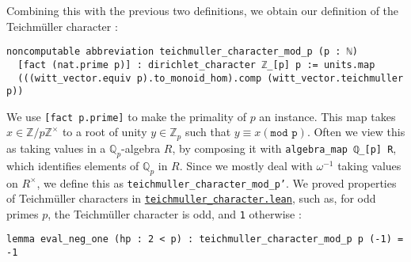 \documentclass[a4paper,UKenglish,cleveref, autoref, thm-restate,pdfa]{lipics-v2021}
\newcommand{\lean}[1]{\texttt{#1}\xspace} %
\begin{document}
Combining this with the previous two definitions, we obtain our definition of the Teichmüller character : 
\begin{lstlisting}
noncomputable abbreviation teichmuller_character_mod_p (p : ℕ) 
  [fact (nat.prime p)] : dirichlet_character ℤ_[p] p := units.map 
  (((witt_vector.equiv p).to_monoid_hom).comp (witt_vector.teichmuller p))
\end{lstlisting}
We use \lean{[fact p.prime]} to make the primality of $p$ an instance. This map takes \newline $x \in \mathbb{Z}/p\mathbb{Z}^{\times}$ to a root of unity $y \in \mathbb{Z}_p$ such that $y \equiv x (\texttt{mod p})$. 
Often we view this as taking values in a $\mathbb{Q}_p$-algebra $R$, by composing it 
with \lean{algebra\_map ℚ\_[p] R}, which identifies elements of $\mathbb{Q}_p$ 
in $R$. Since we mostly deal with $\omega ^{-1}$ taking values on $R^{\times}$, we define this as \lean{teichmuller\_character\_mod\_p'}. \newline
We proved properties of Teichmüller characters in \href{https://github.com/laughinggas/p-adic-L-functions/blob/main/src/dirichlet_character/teichmuller_character.lean}{\lean{teichmuller\_character.lean}}, 
such as, for odd primes $p$, the Teichmüller character is odd, and \lean{1} otherwise : 
\begin{lstlisting}
lemma eval_neg_one (hp : 2 < p) : teichmuller_character_mod_p p (-1) = -1
\end{lstlisting}
\end{document}
